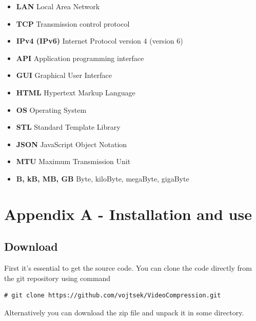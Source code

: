  
% 






\listoffigures

\listoftables

\begin{itemize}
\item \textbf{LAN} Local Area Network
\item \textbf{TCP} Transmission control protocol
\item \textbf{IPv4 (IPv6)} Internet Protocol version 4 (version 6)
\item \textbf{API} Application programming interface
\item \textbf{GUI} Graphical User Interface
\item \textbf{HTML} Hypertext Markup Language
\item \textbf{OS} Operating System
\item \textbf{STL} Standard Template Library
\item \textbf{JSON} JavaScript Object Notation
\item \textbf{MTU} Maximum Transmission Unit
\item \textbf{B, kB, MB, GB} Byte, kiloByte, megaByte, gigaByte
\end{itemize}


\section*{Appendix A - Installation and use}
\subsection*{Download} 
First it's essential to get the source code. You can clone the code directly from the git repository using command
\begin{verbatim}
# git clone https://github.com/vojtsek/VideoCompression.git
\end{verbatim}
Alternatively you can download the zip file and unpack it in some directory.

